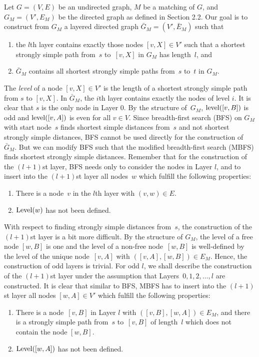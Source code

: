 \documentclass[12pt,twoside,a4paper]{article}
\def\lev{{\rm level}}
\begin{document}
Let $G=(V,E)$ be an undirected graph, $M$ be a matching of $G$, and 
$G_M=(V',E_M)$ be the directed graph as defined in Section 2.2.
Our goal is to construct from $G_M$ a layered directed graph
$\bar{G}_M = (V',\bar{E}_M)$ such that
\begin{enumerate}
\item the $l$th layer contains exactly those nodes $[v,X]\in V'$ such that a
      shortest strongly simple path from~$s$ to~$[v,X]$ in $G_M$ has length~$l$, and
\item $\bar{G}_M$ contains all shortest strongly simple paths from~$s$ to~$t$ 
      in $G_M$.
\end{enumerate}
The {\em level} of a node $[v,X] \in V'$ is the length of a shortest strongly simple path 
from $s$ to $[v,X]$. In $\bar{G}_M$, the $i$th layer contains exactly the nodes of level
$i$. It is clear that $s$ is the only node in Layer 0. 
By the structure of~$G_M$, $\lev([v,B])$ is odd and $\lev([v,A])$ is even for all 
$v \in V$. Since breadth-first search (BFS) on $G_M$ with start node~$s$ finds shortest 
simple distances from~$s$ and not shortest strongly simple distances, BFS cannot be
used directly for the construction of $\bar{G}_M$. But we can modify BFS 
such that the modified breadth-first search (MBFS) finds shortest strongly 
simple distances.
Remember that for the construction of the $(l+1)$st layer, BFS needs only
to consider the nodes in Layer $l$, and to insert into the $(l+1)$st layer 
all nodes~$w$  which fulfill the following properties:
\begin{enumerate}
\item There is a node~$v$ in the $l$th layer with $(v,w)\in E$.
\item ${\rm Level}(w)$ has not been defined.
\end{enumerate}
With respect to finding strongly simple distances from~$s$, the construction of
the $(l+1)$st layer is a bit more difficult.
By the structure of $G_M$, the level of a free node $[w,B]$ is one and
the level of a non-free node~$[w,B]$ is
well-defined by the level of the unique node~$[v,A]$ with
$([v,A],[w,B])\in E_M$. Hence, the construction of odd layers is trivial.
For odd $l$, we shall describe the construction of the $(l+1)$st layer under 
the assumption that Layers~$0,1,2,\ldots,l$ are constructed.
It is clear that similar to BFS, MBFS has to insert into the $(l+1)$st layer 
all nodes $[w,A]\in V'$ which fulfill the following properties:
\begin{enumerate}
\item There is a node~$[v,B]$ in Layer $l$ with $([v,B],[w,A])
        \in E_M$, and there is a strongly simple path
        from~$s$ to~$[v,B]$ of length~$l$ which does not contain the node $[w,B]$.
\item ${\rm Level}([w,A])$ has not been defined.
\end{enumerate}
\end{document}
